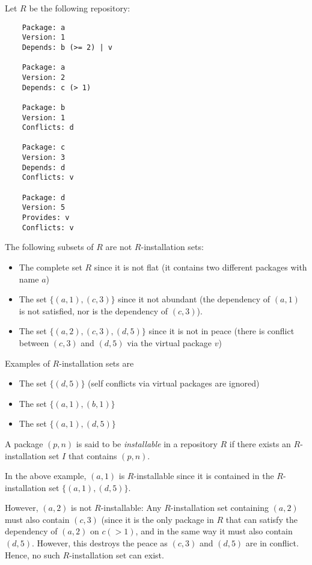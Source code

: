 \begin{example}
  Let $R$ be the following repository:
\begin{verbatim}
    Package: a
    Version: 1
    Depends: b (>= 2) | v

    Package: a 
    Version: 2
    Depends: c (> 1)

    Package: b
    Version: 1
    Conflicts: d

    Package: c
    Version: 3
    Depends: d
    Conflicts: v

    Package: d
    Version: 5
    Provides: v
    Conflicts: v
\end{verbatim}

The following subsets of $R$ are not $R$-installation sets:
\begin{itemize}
\item The complete set $R$ since it is not flat (it contains two
  different packages with name $a$)
\item The set $\{(a,1), (c,3)\}$ since it not abundant (the dependency
  of $(a,1)$ is not satisfied, nor is the dependency of $(c,3)$).
\item The set $\{(a,2), (c,3), (d,5)\}$ since it is not in peace
  (there is conflict between $(c,3)$ and $(d,5)$ via the virtual package $v$)
\end{itemize}
Examples of $R$-installation sets are
\begin{itemize}
\item The set $\{(d,5)\}$ (self conflicts via virtual packages are ignored)
\item The set $\{(a,1), (b,1)\}$
\item The set $\{(a,1), (d,5)\}$
\end{itemize}
\end{example}

A package $(p,n)$ is said to be \emph{installable} in a repository $R$
if there exists an $R$-installation set $I$ that contains $(p,n)$.

\begin{example}
  In the above example, $(a,1)$ is $R$-installable since it is contained
  in the $R$-installation set $\{(a,1), (d,5) \}$.

  However, $(a,2)$ is not $R$-installable: Any $R$-installation set
  containing $(a,2)$ must also contain $(c,3)$ (since it is the only
  package in $R$ that can satisfy the dependency of $(a,2)$ on $c
  (>1)$, and in the same way it must also contain $(d,5)$. However, this
  destroys the peace as $(c,3)$ and $(d,5)$ are in conflict. Hence, no such
  $R$-installation set can exist.
\end{example}

